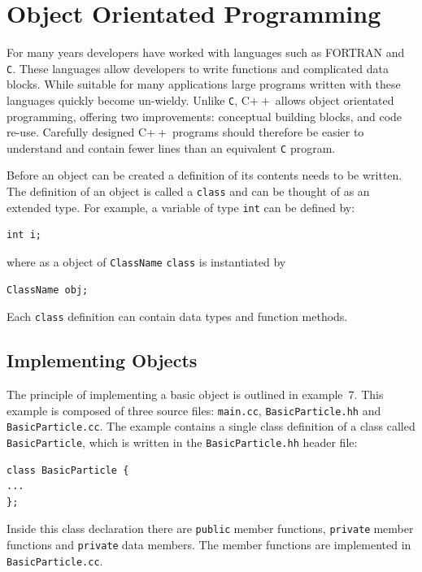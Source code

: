 \documentclass[11pt,a4paper]{scrartcl}
\def\cpp{C$++\;$}
\def\public{\texttt{public}$\;$}
\def\private{\texttt{private}$\;$}
\begin{document}
\section{Object Orientated Programming \label{section:ooprog}}

For many years developers have worked with languages such as FORTRAN
and \texttt{C}.  These languages allow developers to write functions
and complicated data blocks.  While suitable for many applications
large programs written with these languages quickly become un-wieldy.
Unlike \texttt{C}, \cpp allows object orientated programming, offering
two improvements: conceptual building blocks, and code re-use.
Carefully designed \cpp programs should therefore be easier to
understand and contain fewer lines than an equivalent \texttt{C}
program.

Before an object can be created a definition of its contents needs to
be written.  The definition of an object is called a \texttt{class}
and can be thought of as an extended type.  For example, a variable of
type \texttt{int} can be defined by:
%
\begin{verbatim}
int i;
\end{verbatim}
%
where as a object of \texttt{ClassName} \texttt{class} is instantiated by
%
\begin{verbatim}
ClassName obj;
\end{verbatim}
%
Each \texttt{class} definition can contain data types and function
methods.


\subsection{Implementing Objects}
The principle of implementing a basic object is outlined in example~7.
This example is composed of three source files:
\texttt{main.cc}, \texttt{BasicParticle.hh} and
\texttt{BasicParticle.cc}.  The example contains a single class
definition of a class called \texttt{BasicParticle}, which is written
in the \texttt{BasicParticle.hh} header file:
%
\begin{verbatim}
class BasicParticle {
...
};
\end{verbatim}
%
Inside this class declaration there are \public member functions,
\private member functions and \private data members.  The member
functions are implemented in \texttt{BasicParticle.cc}.
\end{document}
